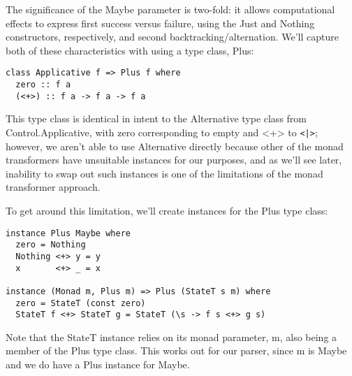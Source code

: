 \documentclass{tmr}
\begin{document}
The significance of the Maybe parameter is two-fold:  it allows computational
effects to express first success versus failure, using the Just and Nothing 
constructors, respectively, and second backtracking/alternation.  We'll
capture both of these characteristics with using a type class, Plus:
\begin{verbatim}
class Applicative f => Plus f where
  zero :: f a
  (<+>) :: f a -> f a -> f a
\end{verbatim}
This type class is identical in intent to the Alternative type class from
Control.Applicative, with zero corresponding to empty and <+> to \verb+<|>+; 
however, we aren't able to use Alternative directly because
other of the monad transformers have unsuitable instances for our purposes,
and as we'll see later, inability to swap out such instances is one of the 
limitations of the monad transformer approach.  

To get around this limitation, we'll create instances for the Plus type class:
\begin{verbatim}
instance Plus Maybe where
  zero = Nothing
  Nothing <+> y = y
  x       <+> _ = x

instance (Monad m, Plus m) => Plus (StateT s m) where
  zero = StateT (const zero)
  StateT f <+> StateT g = StateT (\s -> f s <+> g s)
\end{verbatim}
Note that the StateT instance relies on its monad parameter, m, also being a 
member of the Plus type class.  This works out for our parser, since m is Maybe
and we do have a Plus instance for Maybe.
\end{document}
